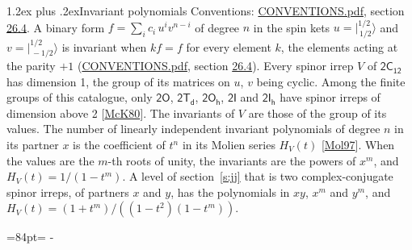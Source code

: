 \documentclass[10pt,a4paper]{article}
\makeatletter
\renewcommand\section{\@startsection{section}{1}{\z@}{-3ex plus -1ex minus -.2ex}%
  {1.2ex plus .2ex}{\normalfont\large\sffamily\bfseries\color{parttitle}}}
\newcommand{\needspace}[1]{\par\penalty-100\begingroup\dimen0=#1\relax\dimen2=\pagegoal
  \advance\dimen2-\pagetotal\ifdim\dimen0>\dimen2\relax\ifdim\dimen2>0pt\vfil\break\fi\fi
  \endgroup}
\numberwithin{equation}{section}
\newcommand{\grp}[1]{\mathsf{#1}}
\newcommand{\jm}[2]{\bigl\lvert{}^{#1}_{\,#2}\bigr\rangle}
\makeatother
\begin{document}
\section{Invariant polynomials}\label{s:invariants}
Conventions: \href{../../CONVENTIONS.pdf}{CONVENTIONS.pdf}, section \href{../../CONVENTIONS.pdf\#conv.26.4}{26.4}.
\leavevmode\label{n:local.binary.form}A binary form $f = \sum_i c_i\, u^i v^{n-i}$ of degree $n$ in the spin kets $u = \jm{1/2}{1/2}$ and $v = \jm{1/2}{-1/2}$ is invariant when $k f = f$ for every element $k$, the elements acting at the parity $+1$ (\href{../../CONVENTIONS.pdf}{CONVENTIONS.pdf}, section \href{../../CONVENTIONS.pdf\#conv.26.4}{26.4}).
\leavevmode\label{n:function.hilbert}Every spinor irrep $V$ of $\grp{2C_{12}}$ has dimension 1, the group of its matrices on $u$, $v$ being cyclic. Among the finite groups of this catalogue, only $\grp{2O}$, $\grp{2T_{d}}$, $\grp{2O_{h}}$, $\grp{2I}$ and $\grp{2I_{h}}$ have spinor irreps of dimension above 2 [\href{../../../REFERENCES.pdf\#ref.McK80}{McK80}]. The invariants of $V$ are those of the group of its values. \label{n:local.partner.x}The number of linearly independent invariant polynomials of degree $n$ in its partner $x$ is the coefficient of $t^n$ in its Molien series $H_V(t)$ [\href{../../../REFERENCES.pdf\#ref.Mol97}{Mol97}]. When the values are the $m$-th roots of unity, the invariants are the powers of $x^{m}$, and $H_V(t) = 1/(1 - t^{m})$. A level of section~\ref{s:jj} that is two complex-conjugate spinor irreps, of partners $x$ and $y$, has the polynomials in $xy$, $x^{m}$ and $y^{m}$, and $H_V(t) = (1 + t^{m})/((1 - t^{2})(1 - t^{m}))$.
\needspace{84pt}
\end{document}
